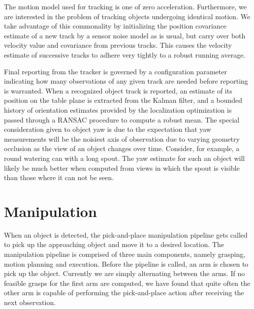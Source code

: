 \documentclass[letterpaper, 10 pt, conference]{ieeeconf}  %
\begin{document}
The motion model used for tracking is one of zero
acceleration. Furthermore, we are interested in the problem of
tracking objects undergoing identical motion. We take advantage of
this commonality by initializing the position covariance estimate of a
new track by a sensor noise model as is usual, but carry over both
velocity value and covariance from previous tracks. This causes the
velocity estimate of successive tracks to adhere very tightly to a
robust running average.

Final reporting from the tracker is governed by a configuration
parameter indicating how many observations of any given track are
needed before reporting is warranted. When a recognized object track
is reported, an estimate of its position on the table plane is
extracted from the Kalman filter, and a bounded history of orientation
estimates provided by the localization optimization is passed through
a RANSAC \cite{Fischler1981:RANSAC} procedure to compute a robust
mean. The special consideration given to object yaw is due to the
expectation that yaw measurements will be the noisiest axis of
observation due to varying geometry occlusion as the view of an object
changes over time. Consider, for example, a round watering can with a
long spout. The yaw estimate for such an object will likely be much
better when computed from views in which the spout is visible than
those where it can not be seen.



\section{Manipulation}

When an object is detected, the pick-and-place manipulation pipeline
gets called to pick up the approaching object and move it to a desired
location. The manipulation pipeline is comprised of three main
components, namely grasping, motion planning and execution. Before the
pipeline is called, an arm is chosen to pick up the object. Currently
we are simply alternating between the arms. If no feasible grasps for
the first arm are computed, we have found that quite often the other
arm is capable of performing the pick-and-place action after receiving
the next observation.
\end{document}
